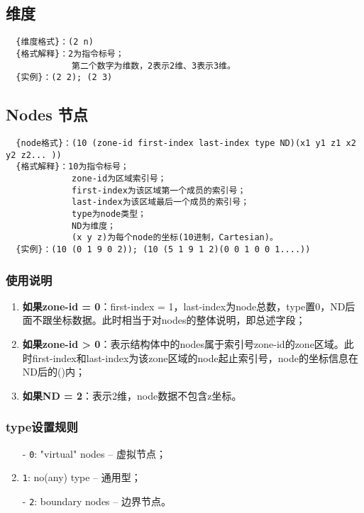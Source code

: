 \documentclass[lang=cn,11pt,a4paper]{elegantpaper} %
\begin{document}
\subsection{维度}\label{Dimensions}
\begin{lstlisting}
  {维度格式}：(2 n)
  {格式解释}：2为指令标号；
             第二个数字为维数，2表示2维、3表示3维。
  {实例}：(2 2); (2 3)
\end{lstlisting}

\subsection{Nodes 节点}\label{Nodes}
\begin{lstlisting}
  {node格式}：(10 (zone-id first-index last-index type ND)(x1 y1 z1 x2 y2 z2... ))
  {格式解释}：10为指令标号；
             zone-id为区域索引号；
             first-index为该区域第一个成员的索引号；
             last-index为该区域最后一个成员的索引号；
             type为node类型；
             ND为维度；
             (x y z)为每个node的坐标(10进制，Cartesian)。
  {实例}：(10 (0 1 9 0 2)); (10 (5 1 9 1 2)(0 0 1 0 0 1....))
\end{lstlisting}

\subsubsection{使用说明}
\begin{enumerate}
  \item \textbf{如果zone-id = 0}：first-index = 1，last-index为node总数，type置0，ND后面不跟坐标数据。此时相当于对nodes的整体说明，即总述字段；
  \item \textbf{如果zone-id > 0}：表示结构体中的nodes属于索引号zone-id的zone区域。此时first-index和last-index为该zone区域的node起止索引号，node的坐标信息在ND后的()内；
  \item \textbf{如果ND = 2}：表示2维，node数据不包含z坐标。
\end{enumerate}

\subsubsection{type设置规则}\label{node-type}
\begin{enumerate}
  \item[-] \lstinline{0}: "virtual" nodes -- 虚拟节点；
  \item[-] \lstinline{1}: no(any) type -- 通用型；
  \item[-] \lstinline{2}: boundary nodes -- 边界节点。
\end{enumerate}
\end{document}

